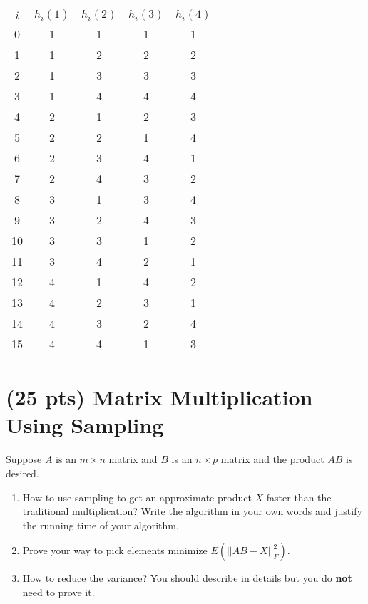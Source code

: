 \documentclass[12pt]{article}
\begin{document}
\begin{table}
	\centering
\begin{tabular}{c|cccc}
	$i$ & $h_i(1)$ & $h_i(2)$ & $h_i(3)$ & $h_i(4)$ \\
	\hline
0 & 1 & 1 & 1 & 1 \\
1 & 1 & 2 & 2 & 2 \\
2 & 1 & 3 & 3 & 3 \\
3 & 1 & 4 & 4 & 4 \\
4 & 2 & 1 & 2 & 3 \\
5 & 2 & 2 & 1 & 4 \\
6 & 2 & 3 & 4 & 1 \\
7 & 2 & 4 & 3 & 2 \\
8 & 3 & 1 & 3 & 4 \\
9 & 3 & 2 & 4 & 3 \\
10 & 3 & 3 & 1 & 2 \\
11 & 3 & 4 & 2 & 1 \\
12 & 4 & 1 & 4 & 2 \\
13 & 4 & 2 & 3 & 1 \\
14 & 4 & 3 & 2 & 4 \\
15 & 4 & 4 & 1 & 3
\end{tabular}
\end{table}

\section{(25 pts) Matrix Multiplication Using Sampling}

Suppose $A$ is an $m \times n$ matrix and $B$ is an $n \times p$ matrix and the product $AB$ is desired.
\begin{enumerate}
    \item 
    How to use sampling to get an approximate product $X$ faster than the traditional multiplication? Write the algorithm in your own words and justify the running time of your algorithm.
    \item
    Prove your way to pick elements minimize $E(||AB-X||^2_F)$.
    \item
    How to reduce the variance? You should describe in details but you do {\bf not} need to prove it.
\end{enumerate}
   
\end{document}
